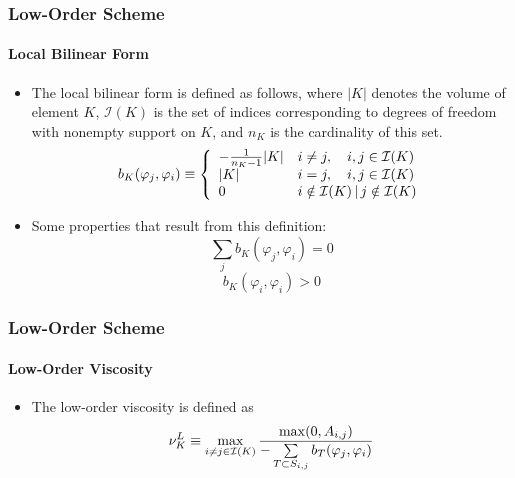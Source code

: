 \documentclass{beamer}
\begin{document}
\begin{frame}
\frametitle{Low-Order Scheme}
\framesubtitle{Local Bilinear Form}

\begin{itemize}
   \item The local bilinear form is defined as follows, where $|K|$ denotes
      the volume of element $K$, $\mathcal{I}(K)$ is the set of indices
      corresponding to degrees of freedom with nonempty support on $K$, and
      $n_K$ is the cardinality of this set.
   \begin{equation}
      b_K(\varphi_j, \varphi_i) \equiv \left\{\begin{array}{l l}
         -\frac{1}{n_K - 1}|K| & i\ne j, \quad i,j\in \mathcal{I}(K)\\
         |K|                   & i = j,  \quad i,j\in \mathcal{I}(K)\\
         0                     & i\notin\mathcal{I}(K)\,|\, j\notin\mathcal{I}(K)
      \end{array}\right.
   \end{equation}
   \item Some properties that result from this definition:
   \begin{equation}
      \sum\limits_j b_K(\varphi_j, \varphi_i) = 0
   \end{equation}
   \begin{equation}
      b_K(\varphi_i, \varphi_i) > 0
   \end{equation}
\end{itemize}

\end{frame}
\begin{frame}
\frametitle{Low-Order Scheme}
\framesubtitle{Low-Order Viscosity}

\begin{itemize}
   \item The low-order viscosity is defined as
   \begin{equation}
      \nu_K^L \equiv \max\limits_{i\ne j\in \mathcal{I}(K)}\frac{\max(0,A_{i,j})}
      {-\sum\limits_{T\subset S_{i,j}} b_T(\varphi_j, \varphi_i)}
   \end{equation}
\end{itemize}

\end{frame}
\end{document}
